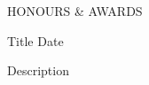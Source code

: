 
\begin{ResumeSection}{HONOURS \& AWARDS} 
    
    \begin{DatedField}
        {Title}
        {Date}
        {}
        {}
        \item Description
    \end{DatedField}
    
\end{ResumeSection}